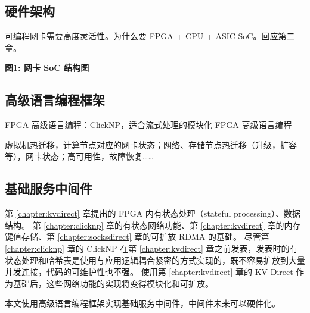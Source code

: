 \subsection{硬件架构}

可编程网卡需要高度灵活性。为什么要 FPGA + CPU + ASIC SoC。回应第二章。

\textbf{图1: 网卡 SoC 结构图}

\subsection{高级语言编程框架}

FPGA 高级语言编程：ClickNP，适合流式处理的模块化 FPGA 高级语言编程

虚拟机热迁移，计算节点对应的网卡状态；网络、存储节点热迁移（升级，扩容等），网卡状态；高可用性，故障恢复……

\subsection{基础服务中间件}



第 \ref{chapter:kvdirect} 章提出的 FPGA 内有状态处理（stateful processing）、数据结构。
第 \ref{chapter:clicknp} 章的有状态网络功能、第 \ref{chapter:kvdirect} 章的内存键值存储、第 \ref{chapter:socksdirect} 章的可扩放 RDMA 的基础。
尽管第 \ref{chapter:clicknp} 章的 ClickNP 在第 \ref{chapter:kvdirect} 章之前发表，发表时的有状态处理和哈希表是使用与应用逻辑耦合紧密的方式实现的，既不容易扩放到大量并发连接，代码的可维护性也不强。
使用第 \ref{chapter:kvdirect} 章的 KV-Direct 作为基础后，这些网络功能的实现将变得模块化和可扩放。

本文使用高级语言编程框架实现基础服务中间件，中间件未来可以硬件化。
